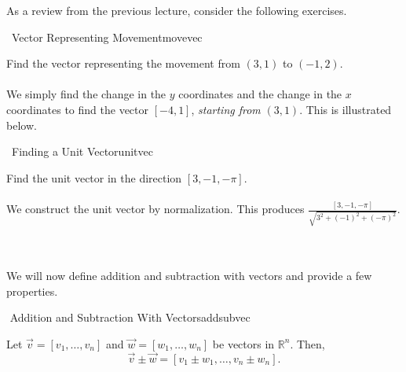     As a review from the previous lecture, consider the following exercises.
    \begin{example}{\Difficulty\,\Difficulty\,\,Vector Representing Movement}{movevec}

        Find the vector representing the movement from \((3,1)\) to \((-1,2)\).
        \\
        \\
        We simply find the change in the \(y\) coordinates and the change in the \(x\) coordinates to find the vector \([-4, 1]\), \textit{starting from} \((3,1)\). This is illustrated below.
        \begin{center}
        \end{center}
        
    \end{example}
    \begin{example}{\Difficulty\,\Difficulty\,\,Finding a Unit Vector}{unitvec}

        Find the unit vector in the direction \([3,-1,-\pi]\).
        \\
        \\
        We construct the unit vector by normalization. This produces \(\frac{[3,-1,-\pi]}{\sqrt{3^2+(-1)^2+(-\pi)^2}}\).
    
    \end{example}
    \pagebreak
    \vphantom
    \\
    \\
    We will now define addition and subtraction with vectors and provide a few properties.
    \begin{definition}{\Stop\,\,Addition and Subtraction With Vectors}{addsubvec}

        Let \(\vec{v}=[v_1,\ldots,v_n]\) and \(\vec{w}=[w_1,\ldots,w_n]\) be vectors in \(\mathbb{R}^n\). Then,
        \begin{equation*}
            \vec{v}\pm\vec{w}=[v_1\pm w_1,\ldots,v_n\pm w_n].
        \end{equation*}
        
    \end{definition}
